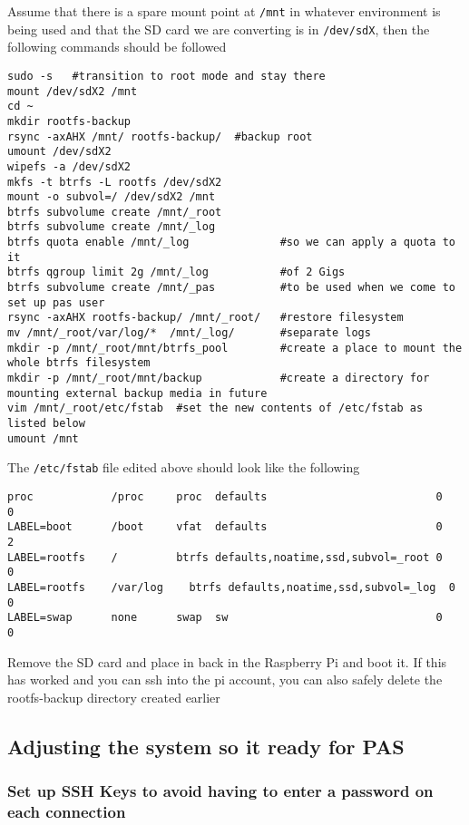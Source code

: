 \documentclass[Draft]{akc}
\begin{document}
Assume that there is a spare mount point at \texttt{/mnt} in whatever environment is being used and that the
SD card we are converting is in \texttt{/dev/sdX}, then the
following commands should be followed

\begin{lstlisting}
sudo -s   #transition to root mode and stay there
mount /dev/sdX2 /mnt
cd ~
mkdir rootfs-backup
rsync -axAHX /mnt/ rootfs-backup/  #backup root
umount /dev/sdX2
wipefs -a /dev/sdX2
mkfs -t btrfs -L rootfs /dev/sdX2
mount -o subvol=/ /dev/sdX2 /mnt
btrfs subvolume create /mnt/_root
btrfs subvolume create /mnt/_log
btrfs quota enable /mnt/_log              #so we can apply a quota to it
btrfs qgroup limit 2g /mnt/_log           #of 2 Gigs
btrfs subvolume create /mnt/_pas          #to be used when we come to set up pas user
rsync -axAHX rootfs-backup/ /mnt/_root/   #restore filesystem
mv /mnt/_root/var/log/*  /mnt/_log/       #separate logs
mkdir -p /mnt/_root/mnt/btrfs_pool        #create a place to mount the whole btrfs filesystem
mkdir -p /mnt/_root/mnt/backup            #create a directory for mounting external backup media in future
vim /mnt/_root/etc/fstab  #set the new contents of /etc/fstab as listed below
umount /mnt
\end{lstlisting}

The \texttt{/etc/fstab} file edited above should look like the following

\begin{lstlisting}
proc            /proc     proc  defaults                          0    0
LABEL=boot      /boot     vfat  defaults                          0    2
LABEL=rootfs    /         btrfs defaults,noatime,ssd,subvol=_root 0    0
LABEL=rootfs    /var/log	btrfs defaults,noatime,ssd,subvol=_log  0    0
LABEL=swap      none      swap  sw                                0    0
\end{lstlisting}

Remove the SD card and place in back in the Raspberry Pi and boot it.  If this has worked and you can ssh into the pi
account, you can also safely delete the rootfs-backup directory created earlier


\subsection{Adjusting the system so it ready for PAS}

\subsubsection{Set up SSH Keys to avoid having to enter a password on each connection}
\end{document}
